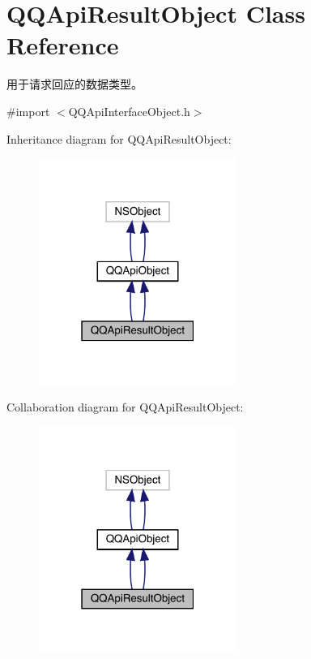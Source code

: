 \hypertarget{interface_q_q_api_result_object}{}\section{Q\+Q\+Api\+Result\+Object Class Reference}
\label{interface_q_q_api_result_object}


用于请求回应的数据类型。  




{\ttfamily \#import $<$Q\+Q\+Api\+Interface\+Object.\+h$>$}



Inheritance diagram for Q\+Q\+Api\+Result\+Object\+:\nopagebreak
\begin{figure}[H]
\begin{center}
\leavevmode
\includegraphics[width=183pt]{interface_q_q_api_result_object__inherit__graph}
\end{center}
\end{figure}


Collaboration diagram for Q\+Q\+Api\+Result\+Object\+:\nopagebreak
\begin{figure}[H]
\begin{center}
\leavevmode
\includegraphics[width=183pt]{interface_q_q_api_result_object__coll__graph}
\end{center}
\end{figure}
